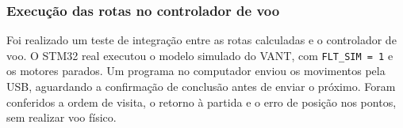 \subsubsection{Execução das rotas no controlador de voo}\label{subsubsec:rotas_execucao_stm32}

Foi realizado um teste de integração entre as rotas calculadas e o controlador de voo. O STM32 real executou o modelo simulado do VANT, com \texttt{FLT\_SIM = 1} e os motores parados. Um programa no computador enviou os movimentos pela USB, aguardando a confirmação de conclusão antes de enviar o próximo. Foram conferidos a ordem de visita, o retorno à partida e o erro de posição nos pontos, sem realizar voo físico.
